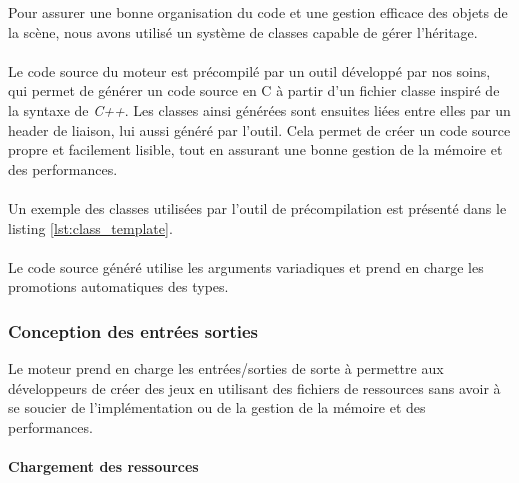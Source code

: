     Pour assurer une bonne organisation du code et une gestion efficace
    des objets de la scène, nous avons utilisé un système de classes capable
    de gérer l'héritage.
    \\ \\
    Le code source du moteur est précompilé par un outil développé par nos
    soins, qui permet de générer un code source en C à partir d'un fichier
    classe inspiré de la syntaxe de \emph{C++}. Les classes ainsi générées
    sont ensuites liées entre elles par un header de liaison, lui aussi
    généré par l'outil. Cela permet de créer un code source propre et
    facilement lisible, tout en assurant une bonne gestion de la mémoire et des
    performances.
    \\ \\
    Un exemple des classes utilisées par l'outil de précompilation est
    présenté dans le listing \ref{lst:class_template}.
    \\ \\
    Le code source généré utilise les arguments variadiques et prend en charge
    les promotions automatiques des types.
\subsubsection{Conception des entrées sorties}

    Le moteur prend en charge les entrées/sorties de sorte à permettre
    aux développeurs de créer des jeux en utilisant des fichiers de
    ressources sans avoir à se soucier de l'implémentation ou de la gestion
    de la mémoire et des performances.
\paragraph{Chargement des ressources}

